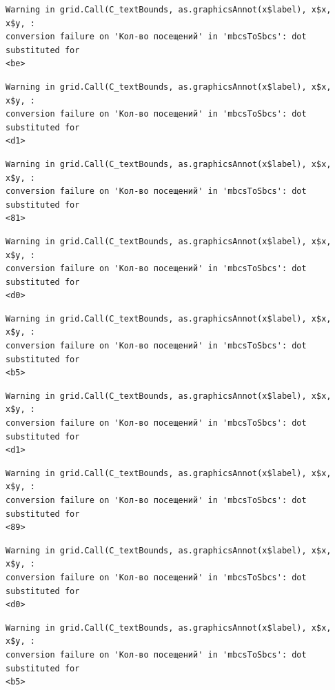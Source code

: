 \documentclass[
  letterpaper,
  DIV=11,
  numbers=noendperiod]{scrartcl}
\begin{document}
\begin{verbatim}
Warning in grid.Call(C_textBounds, as.graphicsAnnot(x$label), x$x, x$y, :
conversion failure on 'Кол-во посещений' in 'mbcsToSbcs': dot substituted for
<be>
\end{verbatim}

\begin{verbatim}
Warning in grid.Call(C_textBounds, as.graphicsAnnot(x$label), x$x, x$y, :
conversion failure on 'Кол-во посещений' in 'mbcsToSbcs': dot substituted for
<d1>
\end{verbatim}

\begin{verbatim}
Warning in grid.Call(C_textBounds, as.graphicsAnnot(x$label), x$x, x$y, :
conversion failure on 'Кол-во посещений' in 'mbcsToSbcs': dot substituted for
<81>
\end{verbatim}

\begin{verbatim}
Warning in grid.Call(C_textBounds, as.graphicsAnnot(x$label), x$x, x$y, :
conversion failure on 'Кол-во посещений' in 'mbcsToSbcs': dot substituted for
<d0>
\end{verbatim}

\begin{verbatim}
Warning in grid.Call(C_textBounds, as.graphicsAnnot(x$label), x$x, x$y, :
conversion failure on 'Кол-во посещений' in 'mbcsToSbcs': dot substituted for
<b5>
\end{verbatim}

\begin{verbatim}
Warning in grid.Call(C_textBounds, as.graphicsAnnot(x$label), x$x, x$y, :
conversion failure on 'Кол-во посещений' in 'mbcsToSbcs': dot substituted for
<d1>
\end{verbatim}

\begin{verbatim}
Warning in grid.Call(C_textBounds, as.graphicsAnnot(x$label), x$x, x$y, :
conversion failure on 'Кол-во посещений' in 'mbcsToSbcs': dot substituted for
<89>
\end{verbatim}

\begin{verbatim}
Warning in grid.Call(C_textBounds, as.graphicsAnnot(x$label), x$x, x$y, :
conversion failure on 'Кол-во посещений' in 'mbcsToSbcs': dot substituted for
<d0>
\end{verbatim}

\begin{verbatim}
Warning in grid.Call(C_textBounds, as.graphicsAnnot(x$label), x$x, x$y, :
conversion failure on 'Кол-во посещений' in 'mbcsToSbcs': dot substituted for
<b5>
\end{verbatim}
\end{document}
